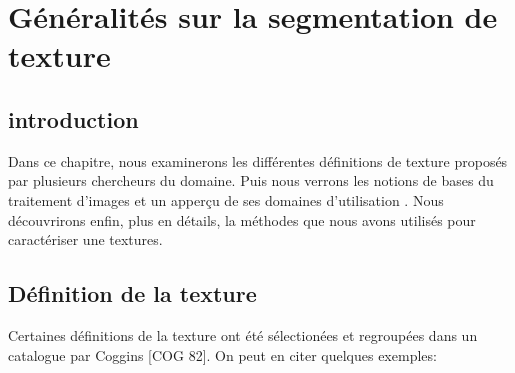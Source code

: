 \chapter{Généralités sur la segmentation de texture} %

\label{Chapter1} %



\section{introduction}

Dans ce chapitre, nous examinerons les différentes définitions de texture proposés par plusieurs chercheurs du domaine. Puis nous verrons les notions de bases du traitement d'images et un apperçu de ses domaines d'utilisation . Nous découvrirons enfin, plus en détails, la méthodes que nous avons utilisés pour caractériser une textures.

\section{Définition de la texture}

\indent Certaines définitions de la texture ont été sélectionées et regroupées dans un catalogue par Coggins [COG 82]. On peut en citer quelques exemples:\\



